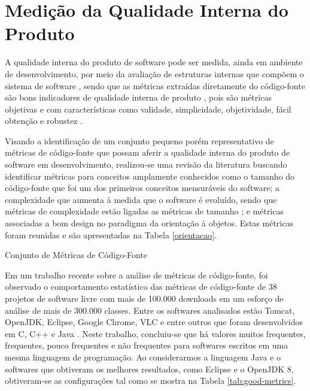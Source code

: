 \section{Medição da Qualidade Interna do Produto}

A qualidade interna do produto de software pode ser medida, ainda em ambiente de desenvolvimento, por meio da avaliação de estruturas internas que compõem o sistema de software \cite{ISO25023}, sendo que as métricas extraídas diretamente do código-fonte são bons indicadores de qualidade interna de produto \cite{beck2003test}, pois são métricas objetivas e com características como validade, simplicidade, objetividade, fácil obtenção e robustez \cite{Mills:1999}.  


Visando a identificação de um conjunto pequeno porém representativo de métricas de código-fonte que possam aferir a qualidade interna do produto de software em desenvolvimento, realizou-se uma revisão da literatura buscando identificar métricas para conceitos amplamente conhecidos como o tamanho do código-fonte que foi um dos primeiros conceitos mensuráveis do software; a complexidade que aumenta à medida que o software é evoluído, sendo que métricas de complexidade estão ligadas as métricas de tamanho \cite{Lehman1980b}; e métricas associadas a bom design no paradigma da orientação à objetos. Estas métricas foram reunidas e são apresentadas na Tabela \ref{orientacao}.     

	\begin{table}[h]
	\caption{Conjunto de Métricas de Código-Fonte}
	\addtolength{\belowcaptionskip}{6pt}
	\begin{center}
	
	\label{orientacao}
	\end{center}
	\end{table}

Em um trabalho recente sobre a análise de métricas de código-fonte, foi observado o comportamento estatístico das métricas de código-fonte de 38 projetos de software livre com mais de 100.000 downloads em um esforço de análise de mais de 300.000 classes. Entre os softwares analisados estão Tomcat, OpenJDK, Eclipse, Google Chrome, VLC e entre outros que foram desenvolvidos em C, C++ e Java \cite{Meirelles2013}. Neste trabalho, concluiu-se que há valores muitos frequentes, frequentes, pouco frequentes e não frequentes para softwares escritos em uma mesma linguagem de programação. Ao considerarmos a linguagem Java e o softwares que obtiveram os melhores resultados, como Eclipse e o OpenJDK 8, obtiveram-se as configurações tal como se mostra na Tabela \ref{tab:good-metrics}.  


